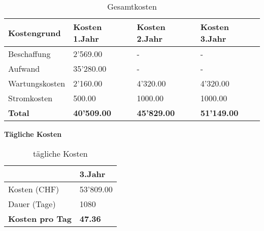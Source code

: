 \begin{table}[H]
\centering
\begin{tabular}{p{4cm}p{4cm}p{4cm}p{4cm}}
\hline
\rowcolor{heading} \textbf{Kostengrund} & \textbf{Kosten 1.Jahr} & \textbf{Kosten 2.Jahr} & \textbf{Kosten 3.Jahr}\\\hline
Beschaffung & 2'569.00 & - & - \\\hline
Aufwand & 35'280.00 & - & - \\\hline
Wartungskosten & 2'160.00 & 4'320.00 & 4'320.00 \\\hline
Stromkosten & 500.00 & 1000.00 & 1000.00 \\\hline
\rowcolor{subheading}\textbf{Total} & \textbf{40'509.00} & \textbf{45'829.00} & \textbf{51'149.00} \\\hline
\end{tabular}
\caption{Gesamtkosten}
\end{table}

\textbf{Tägliche Kosten}

\begin{table}[H]
\centering
\begin{tabular}{p{4cm}p{4cm}}
\hline
\rowcolor{heading} & \textbf{3.Jahr}\\\hline
Kosten (CHF) & 53'809.00 \\\hline
Dauer (Tage) & 1080 \\\hline
\rowcolor{subheading}\textbf{Kosten pro Tag} & \textbf{47.36} \\\hline
\end{tabular}
\caption{tägliche Kosten}
\end{table}


